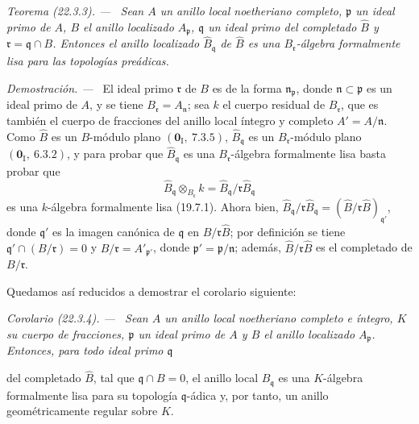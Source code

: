 \documentclass[10pt,oneside]{book}
\makeatletter
\newcommand{\setmanualcurrentlabel}[1]{\def\@currentlabel{#1}}
\newcommand{\oldpage}[2][]{%
  \setcounter{footnote}{0}%
  \marginpar{\scriptsize\textbf{#1}~|~#2}\ignorespaces}
\newenvironment{theorem}[1][]{%
  \setmanualcurrentlabel{#1}\par\medskip\noindent\itshape Teorema (#1). ---\ }{\par}
\newenvironment{corollary}[1][]{%
  \setmanualcurrentlabel{#1}\par\medskip\noindent\itshape Corolario (#1). ---\ }{\par}
\newenvironment{proof}{%
  \par\medskip\noindent\textit{Demostración. ---\ }}{\par}
\makeatother
\begin{document}
\begin{theorem}[22.3.3]
\label{0.22.3.3-es}
Sean $A$ un anillo local noetheriano \textup{completo}, $\mathfrak p$ un ideal primo
de $A$, $B$ el anillo localizado $A_\mathfrak p$, $\mathfrak q$ un ideal
primo del completado $\widehat B$ y $\mathfrak r=\mathfrak q\cap B$.
Entonces el anillo localizado $\widehat B_\mathfrak q$ de $\widehat B$ es una
$B_\mathfrak r$-álgebra formalmente lisa para las topologías preádicas.
\end{theorem}

\begin{proof}
El ideal primo $\mathfrak r$ de $B$ es de la forma
$\mathfrak n_\mathfrak p$, donde $\mathfrak n\subset\mathfrak p$ es un ideal
primo de $A$, y se tiene $B_\mathfrak r=A_\mathfrak n$; sea $k$ el cuerpo
residual de $B_\mathfrak r$, que es también el cuerpo de fracciones del anillo
local íntegro y completo $A'=A/\mathfrak n$. Como $\widehat B$ es un
$B$-módulo plano $(\mathbf 0_\mathrm I,~7.3.5)$,
$\widehat B_\mathfrak q$ es un $B_\mathfrak r$-módulo plano
$(\mathbf 0_\mathrm I,~6.3.2)$, y para probar que
$\widehat B_\mathfrak q$ es una $B_\mathfrak r$-álgebra formalmente lisa
basta probar que
\[
  \widehat B_\mathfrak q\otimes_{B_\mathfrak r}k
  =\widehat B_\mathfrak q/\mathfrak r\widehat B_\mathfrak q
\]
es una $k$-álgebra formalmente lisa (19.7.1). Ahora bien,
$\widehat B_\mathfrak q/\mathfrak r\widehat B_\mathfrak q
=(\widehat B/\mathfrak r\widehat B)_{\mathfrak q'}$, donde $\mathfrak q'$ es
la imagen canónica de $\mathfrak q$ en
$\widehat B/\mathfrak r\widehat B$; por definición se tiene
$\mathfrak q'\cap(B/\mathfrak r)=0$ y
$B/\mathfrak r=A'_{\mathfrak p'}$, donde
$\mathfrak p'=\mathfrak p/\mathfrak n$; además,
$\widehat B/\mathfrak r\widehat B$ es el completado de $B/\mathfrak r$.

Quedamos así reducidos a demostrar el corolario siguiente:
\end{proof}

\begin{corollary}[22.3.4]
\label{0.22.3.4-es}
Sean $A$ un anillo local noetheriano \textup{completo} e íntegro, $K$ su cuerpo de
fracciones, $\mathfrak p$ un ideal primo de $A$ y $B$ el anillo localizado
$A_\mathfrak p$. Entonces, para todo ideal primo $\mathfrak q$

\oldpage[0\textsubscript{IV-1}]{193}

del completado $\widehat B$, tal que $\mathfrak q\cap B=0$, el anillo local
$\widehat B_\mathfrak q$ es una $K$-álgebra formalmente lisa para su topología
$\mathfrak q$-ádica y, por tanto, un anillo geométricamente regular sobre
$K$.
\end{corollary}
\end{document}
